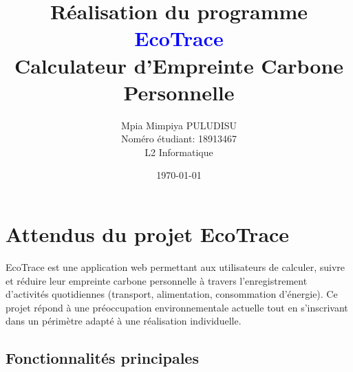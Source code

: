 \documentclass[a4paper,11pt]{article}
\author{Mpia Mimpiya PULUDISU\\Noméro étudiant: 18913467\\L2 Informatique}
\title{\LARGE{Réalisation du programme \\ \vspace{2.8cm} \textcolor{blue}{EcoTrace}\\ Calculateur d'Empreinte Carbone Personnelle\vspace{2.5cm}}}
\date{\today}
\begin{document}
    \maketitle

    \vfill  %

    \noindent{}

    \newpage
    \tableofcontents

    \newpage
    \section{Attendus du projet EcoTrace}

    \noindent EcoTrace est une application web permettant aux utilisateurs de calculer, suivre et réduire leur empreinte carbone personnelle à travers l'enregistrement d'activités quotidiennes (transport, alimentation, consommation d'énergie). Ce projet répond à une préoccupation environnementale actuelle tout en s'inscrivant dans un périmètre adapté à une réalisation individuelle.

    \subsection{Fonctionnalités principales}
\end{document}
